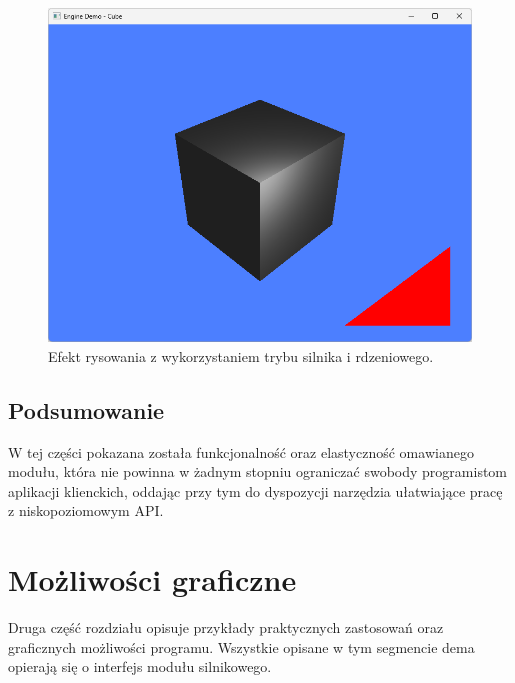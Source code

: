 \vfill
\clearpage

\begin{figure}[h!]
	\centering
	\includegraphics[width=\textwidth]{images/demo_engine_hybrid_drawing.png}
	\caption{Efekt rysowania z wykorzystaniem trybu silnika i rdzeniowego.}
	\label{demo_engine_hybrid_drawing}
\end{figure}

\subsection{Podsumowanie}
W tej części pokazana została funkcjonalność oraz elastyczność omawianego modułu, która nie powinna w żadnym stopniu ograniczać swobody programistom aplikacji klienckich, oddając przy tym do dyspozycji narzędzia ułatwiające pracę z niskopoziomowym API. 

\section{Możliwości graficzne}
Druga część rozdziału opisuje przykłady praktycznych zastosowań oraz graficznych możliwości programu. Wszystkie opisane w tym segmencie dema opierają się o interfejs modułu silnikowego.

